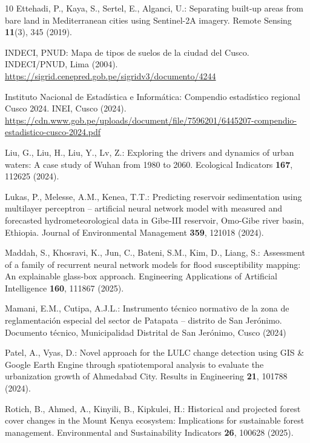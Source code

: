 \documentclass[runningheads]{llncs}
\begin{document}
\begin{thebibliography}{10}
Ettehadi, P., Kaya, S., Sertel, E., Alganci, U.: Separating built-up areas from
  bare land in Mediterranean cities using Sentinel-2A imagery. Remote Sensing
  \textbf{11}(3), 345 (2019). 

{INDECI, PNUD}: Mapa de tipos de suelos de la ciudad del Cusco. INDECI/PNUD,
  Lima (2004). \url{https://sigrid.cenepred.gob.pe/sigridv3/documento/4244}

{Instituto Nacional de Estad{\'i}stica e Inform{\'a}tica}: Compendio
  estad{\'i}stico regional Cusco 2024. INEI, Cusco (2024).
  \url{https://cdn.www.gob.pe/uploads/document/file/7596201/6445207-compendio-estadistico-cusco-2024.pdf}

Liu, G., Liu, H., Liu, Y., Lv, Z.: Exploring the drivers and dynamics of urban
  waters: A case study of Wuhan from 1980 to 2060. Ecological Indicators
  \textbf{167}, 112625 (2024). 

Lukas, P., Melesse, A.M., Kenea, T.T.: Predicting reservoir sedimentation using
  multilayer perceptron -- artificial neural network model with measured and
  forecasted hydrometeorological data in Gibe-III reservoir, Omo-Gibe river
  basin, Ethiopia. Journal of Environmental Management \textbf{359}, 121018
  (2024). 

Maddah, S., Khosravi, K., Jun, C., Bateni, S.M., Kim, D., Liang, S.: Assessment
  of a family of recurrent neural network models for flood susceptibility
  mapping: An explainable glass-box approach. Engineering Applications of
  Artificial Intelligence \textbf{160}, 111867 (2025).

Mamani, E.M., Cutipa, A.J.L.: Instrumento t{\'e}cnico normativo de la zona de
  reglamentaci{\'o}n especial del sector de Patapata -- distrito de San
  Jer{\'o}nimo. Documento t{\'e}cnico, Municipalidad Distrital de San Jer{\'o}nimo,
  Cusco (2024)

Patel, A., Vyas, D.: Novel approach for the LULC change detection using GIS \&
  Google Earth Engine through spatiotemporal analysis to evaluate the
  urbanization growth of Ahmedabad City. Results in Engineering \textbf{21},
  101788 (2024). 

Rotich, B., Ahmed, A., Kinyili, B., Kipkulei, H.: Historical and projected
  forest cover changes in the Mount Kenya ecosystem: Implications for
  sustainable forest management. Environmental and Sustainability Indicators
  \textbf{26}, 100628 (2025). 


\end{thebibliography}
\end{document}
